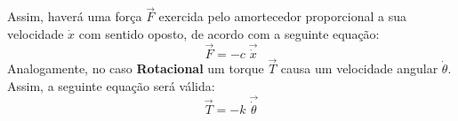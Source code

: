 \documentclass{article}
\begin{document}
\begin{multicols}{2}
                        Assim, haverá uma força $\vec{F}$ exercida pelo amortecedor  proporcional a sua velocidade $\dot{x}$ com sentido oposto, de acordo com a seguinte equação:
                            \begin{equation}
                                \boxed{
                                    \vec{F} = - c\;\vec{\dot{x}}
                                }
                            \end{equation}
                        Analogamente, no caso \textbf{Rotacional} um torque $\vec{T}$ causa um velocidade angular $\dot{\theta}$. Assim, a seguinte equação será válida:
                            \begin{equation}
                                \boxed{
                                    \vec{T} = - k\;\vec{\dot{\theta}}
                                }
                            \end{equation}
                \end{multicols}\noindent
\end{document}
